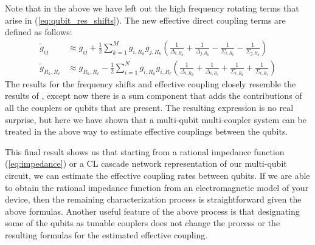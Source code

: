 Note that in the above we have left out the high frequency rotating terms that arise in (\ref{eq:qubit_res_shifts}). The new effective direct coupling terms are defined as follows:
\begin{align}
    \tilde{g}_{ij} &\approx g_{ij} + \frac{1}{2} \sum_{k=1}^M  g_{i,R_k}g_{j,R_k} \left( \frac{1}{\Delta_{i,R_k}} + \frac{1}{\Delta_{j,R_k}}  - \frac{1}{\Sigma_{i,R_k}} - \frac{1}{\Sigma_{j,R_k}}\right) \label{eq:eff_qubit_coupling}\\
    \tilde{g}_{R_k,R_\ell} &\approx g_{R_k,R_\ell} - \frac{1}{2}\sum_{i=1}^N g_{i,R_k}g_{i,R_\ell} \left( \frac{1}{\Delta_{i,R_k}} + \frac{1}{\Delta_{i,R_\ell}} + \frac{1}{\Sigma_{i,R_k}} + \frac{1}{\Sigma_{i,R_\ell}} \right)
\end{align}
The results for the frequency shifts and effective coupling closely resemble the results of \cite{tunable_coupler,tunable_coupler_ext}, except now there is a sum component that adds the contributions of all the couplers or qubits that are present. The resulting expression is no real surprise, but here we have shown that a multi-qubit multi-coupler system can be treated in the above way to estimate effective couplings between the qubits.

This final result shows us that starting from a rational impedance function (\ref{eq:impedance}) or a CL cascade network representation of our multi-qubit circuit, we can estimate the effective coupling rates between qubits. If we are able to obtain the rational impedance function from an electromagnetic model of your device, then the remaining characterization process is straightforward given the above formulas. Another useful feature of the above process is that designating some of the qubits as tunable couplers does not change the process or the resulting formulas for the estimated effective coupling.

